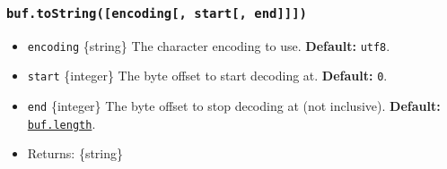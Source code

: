 \begin{Shaded}
\begin{Highlighting}[]
\NormalTok{ \{ }\NormalTok{ \} }\OperatorTok{=} \NormalTok{(}\NormalTok{)}\OperatorTok{;}

\OperatorTok{=} \NormalTok{([}\OperatorTok{,} \OperatorTok{,} \OperatorTok{,} \OperatorTok{,} \NormalTok{])}\OperatorTok{;}
\OperatorTok{=} \OperatorTok{;}

\OperatorTok{;}

\OperatorTok{=} \OperatorTok{,}\OperatorTok{,}\KeywordTok{=\textgreater{}}\NormalTok{ \{}
  \OperatorTok{\&\&} \OperatorTok{===}  
    \OperatorTok{:}
\OperatorTok{;}
\NormalTok{\})}\OperatorTok{;}

\OperatorTok{;}
\end{Highlighting}
\end{Shaded}

\subsubsection{\texorpdfstring{\texttt{buf.toString({[}encoding{[},\ start{[},\ end{]}{]}{]})}}{buf.toString({[}encoding{[}, start{[}, end{]}{]}{]})}}\label{buf.tostringencoding-start-end}

\begin{itemize}
\tightlist
\item
  \texttt{encoding} \{string\} The character encoding to use.
  \textbf{Default:} \texttt{\textquotesingle{}utf8\textquotesingle{}}.
\item
  \texttt{start} \{integer\} The byte offset to start decoding at.
  \textbf{Default:} \texttt{0}.
\item
  \texttt{end} \{integer\} The byte offset to stop decoding at (not
  inclusive). \textbf{Default:}
  \hyperref[buflength]{\texttt{buf.length}}.
\item
  Returns: \{string\}
\end{itemize}

